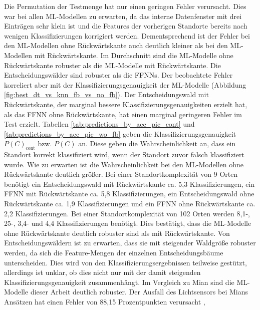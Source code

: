 \newline
Die Permutation der Testmenge hat nur einen geringen Fehler verursacht.
Dies war bei allen ML-Modellen zu erwarten, da das interne Datenfenster mit drei Einträgen sehr klein ist
und die Features der vorherigen Standorte bereits nach wenigen Klassifizierungen korrigiert werden.
Dementsprechend ist der Fehler bei den ML-Modellen ohne Rückwärtskante auch deutlich kleiner als bei den ML-Modellen mit Rückwärtskante.
\newpage
Im Durchschnitt sind die ML-Modelle ohne Rückwärtskante robuster als die ML-Modelle mit Rückwärtskante.
Die Entscheidungswälder sind robuster als die FFNNs.
Der beobachtete Fehler korreliert aber mit der Klassifizierungsgenauigkeit der ML-Modelle (Abbildung \ref{fig:best_dt_vs_knn_fb_vs_no_fb}).
Der Entscheidungswald mit Rückwärtskante, der marginal bessere Klassifizierungsgenauigkeiten erzielt hat, als das FFNN ohne Rückwärtskante,
hat einen marginal geringeren Fehler im Test erzielt.
\newline
\newline
Tabellen \ref{tab:predictions_by_acc_pic_cont} und \ref{tab:predictions_by_acc_pic_wo_fb} geben die Klassifizierungsgenauigkeit $P(C)_{\text{cont}}$ bzw. $P(C)$ an.
Diese geben die Wahrscheinlichkeit an, dass ein Standort korrekt klassifiziert wird, wenn der Standort zuvor falsch klassifiziert wurde.
Wie zu erwarten ist die Wahrscheinlichkeit bei den ML-Modellen ohne Rückwärtskante deutlich größer.
Bei einer Standortkomplexität von 9 Orten benötigt ein Entscheidungswald mit Rückwärtskante ca. 5,3 Klassifizierungen,
ein FFNN mit Rückwärtskante ca. 5,8 Klassifizierungen, ein Entscheidungswald ohne Rückwärtskante ca. 1,9 Klassifizierungen
und ein FFNN ohne Rückwärtskante ca. 2,2 Klassifizierungen.
Bei einer Standortkomplexität von 102 Orten werden 8,1-, 25-, 3,4- und 4,4 Klassifizierungen benötigt.
Dies bestätigt, dass die ML-Modelle ohne Rückwärtskante deutlich robuster sind als mit Rückwärtskante.
\newline
\newline
Von Entscheidungswäldern ist zu erwarten, dass sie mit steigender Waldgröße robuster werden, da sich die Feature-Mengen der einzelnen Entscheidungsbäume unterscheiden.
Dies wird von den Klassifizierungsergebnissen teilweise gestützt, allerdings ist unklar, ob dies nicht nur mit der damit steigenden Klassifizierungsgenauigkeit zusammenhängt.
\newline
\newline
Im Vergleich zu Mian sind die ML-Modelle dieser Arbeit deutlich robuster.
Der Ausfall des Lichtsensors bei Mians Ansätzen hat einen Fehler von 88,15 Prozentpunkten verursacht \cite{naveedThesis},
